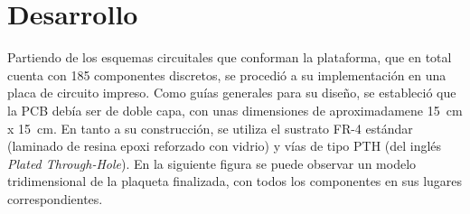 \section{Desarrollo} \label{desarrollo}
\thispagestyle{plain}

\divider

Partiendo de los esquemas circuitales que conforman la plataforma, que en total cuenta con 185 componentes discretos, se procedió a su implementación en una placa de circuito impreso. Como guías generales para su diseño, se estableció que la PCB debía ser de doble capa, con unas dimensiones de aproximadamene \SI[]{15}[]{\centi\metre} x \SI[]{15}[]{\centi\metre}. En tanto a su construcción, se utiliza el sustrato FR-4 estándar (laminado de resina epoxi reforzado con vidrio) y vías de tipo PTH (del inglés \textit{Plated Through-Hole}). En la siguiente figura se puede observar un modelo tridimensional de la plaqueta finalizada, con todos los componentes en sus lugares correspondientes.\\

